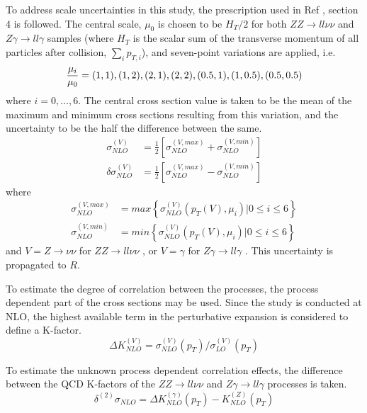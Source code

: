 \documentclass[11pt,a4paper]{report}
\newcommand{\ZZ}{$ZZ\to ll\nu\nu$ }
\newcommand{\Zg}{$Z\gamma\to ll\gamma$ }
\begin{document}
To address scale uncertainties in this study, the prescription used in Ref \cite{precise_scale}, section 4 is followed. The central scale, $\mu_0$ is chosen to be $H_{T}/2$ for both \ZZ and \Zg samples (where $H_T$ is the scalar sum of the transverse momentum of all particles after collision, $\sum_{i} p_{T,i}$), and seven-point variations are applied, i.e.
\begin{equation}
\frac{\mu_i}{\mu_0} = (1,1),(1,2),(2,1),(2,2),(0.5,1),(1,0.5),(0.5,0.5)\\
\label{eq:scale}
\end{equation}
where $i=0,...,6$. The central cross section value is taken to be the mean of the maximum and minimum cross sections resulting from this variation, and the uncertainty to be the half the difference between the same.
\begin{align}
\sigma_{NLO}^{(V)} &= \frac{1}{2}\left[\sigma_{NLO}^{(V,max)} + \sigma_{NLO}^{(V,min)}\right]\\
\delta\sigma_{NLO}^{(V)} &= \frac{1}{2}\left[\sigma_{NLO}^{(V,max)} - \sigma_{NLO}^{(V,min)}\right]
\label{eq:scale_central}
\end{align}
where
\begin{equation}
\begin{split}
\sigma_{NLO}^{(V,max)} &= max\left\lbrace\sigma_{NLO}^{(V)}(p_{T}(V),\mu_i)|0\leq i \leq 6\right\rbrace\\
\sigma_{NLO}^{(V,min)} &= min\left\lbrace\sigma_{NLO}^{(V)}(p_{T}(V),\mu_i)|0\leq i \leq 6\right\rbrace
\end{split}
\end{equation}
and $V = Z\to\nu\nu$ for \ZZ, or $V = \gamma$ for \Zg. This uncertainty is propagated to $R$.

To estimate the degree of correlation between the processes, the process dependent part of the cross sections may be used. Since the study is conducted at NLO, the highest available term in the perturbative expansion is considered to define a K-factor.
\begin{equation}
\Delta K_{NLO}^{(V)} = \sigma_{NLO}^{(V)}(p_T)/\sigma_{LO}^{(V)}(p_T)
\label{eq:K_factor}
\end{equation}

To estimate the unknown process dependent correlation effects, the difference between the QCD K-factors of the \ZZ and \Zg processes is taken.
\begin{equation}
\delta^{(2)} \sigma_{NLO} = \Delta K_{NLO}^{(\gamma)}(p_T) - K_{NLO}^{(Z)}(p_T)
\label{eq:K_factor_unc}
\end{equation}
\end{document}
